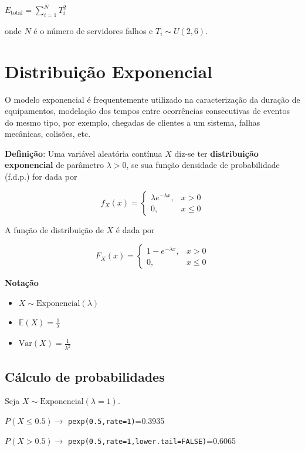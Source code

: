 \documentclass[
]{book}
\providecommand{\tightlist}{%
  \setlength{\itemsep}{0pt}\setlength{\parskip}{0pt}}
\begin{document}
\(E_{\text{total}} = \sum_{i=1}^N T_i^2\)

onde \(N\) é o número de servidores falhos e \(T_i \sim U(2, 6)\).

\section{Distribuição Exponencial}\label{distribuiuxe7uxe3o-exponencial}

O modelo exponencial é frequentemente utilizado na caracterização da duração de equipamentos, modelação dos tempos entre ocorrências consecutivas de eventos do mesmo tipo, por exemplo, chegadas de clientes a um sistema, falhas mecânicas, colisões, etc.

\textbf{Definição}: Uma variável aleatória contínua \(X\) diz-se ter \textbf{distribuição exponencial} de parâmetro \(\lambda > 0\), se sua função densidade de probabilidade (f.d.p.) for dada por

\[
f_X(x) = 
\begin{cases}
\lambda e^{-\lambda x}, & x > 0 \\
0, & x \leq 0
\end{cases}
\]

A função de distribuição de \(X\) é dada por

\[
F_X(x) = 
\begin{cases}
1 - e^{-\lambda x}, & x > 0 \\
0, & x \leq 0
\end{cases}
\]

\textbf{Notação}

\begin{itemize}
\tightlist
\item
  \(X \sim \text{Exponencial}(\lambda)\)
\item
  \(\mathbb{E}(X) = \frac{1}{\lambda}\)
\item
  \(\text{Var}(X) = \frac{1}{\lambda^2}\)
\end{itemize}

\subsection{Cálculo de probabilidades}\label{cuxe1lculo-de-probabilidades-5}

Seja \(X\sim \text{Exponencial}(\lambda=1)\).

\(P(X\leq 0.5) \to\) \texttt{pexp(0.5,rate=1)}=0.3935

\(P(X > 0.5) \to\) \texttt{pexp(0.5,rate=1,lower.tail=FALSE)}=0.6065
\end{document}

